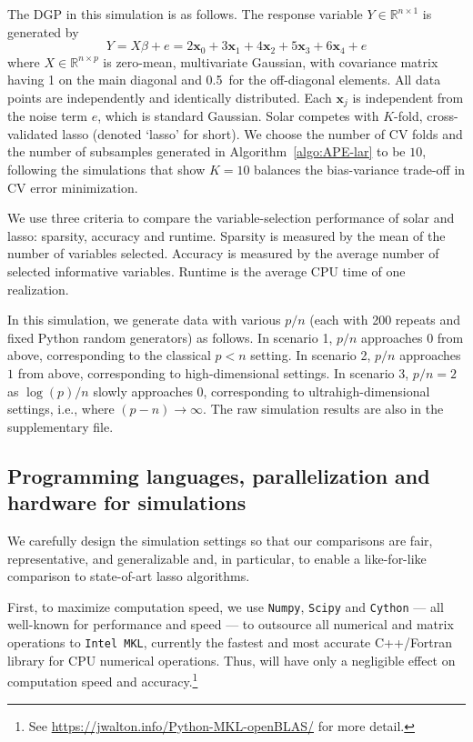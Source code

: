 \documentclass[12pt]{article}
\begin{document}
The DGP in this simulation is as follows. The response variable $Y \in \mathbb{R}^{n \times 1}$ is generated by
%
\begin{equation}
%
  Y =  X\beta + e = 2 \mathbf{x}_0 + 3 \mathbf{x}_1 + 4 \mathbf{x}_2 + 5 \mathbf{x}_3 + 6 \mathbf{x}_4  + e
  \label{eqn:pop_model}
\end{equation}
%
where $X \in \mathbb{R}^{n \times p}$ is zero-mean, multivariate Gaussian, with covariance matrix having 1 on the main diagonal and 0.5~for the off-diagonal elements. All data points are independently and identically distributed. Each $\mathbf{x}_j$ is independent from the noise term $e$, which is standard Gaussian. Solar competes with $K$-fold, cross-validated lasso (denoted `lasso' for short). We choose the number of CV folds and the number of subsamples generated in Algorithm~\ref{algo:APE-lar} to be $10$, following the \citet{friedman2001elements} simulations that show $K = 10$ balances the bias-variance trade-off in CV error minimization.

We use three criteria to compare the variable-selection performance of solar and lasso: sparsity, accuracy and runtime. Sparsity is measured by the mean of the number of variables selected. Accuracy is measured by the average number of selected informative variables. Runtime is the average CPU time of one realization.

In this simulation, we generate data with various $p/n$ (each with 200 repeats and fixed Python random generators) as follows. In scenario 1, $p/n$ approaches $0$ from above, corresponding to the classical $p<n$ setting. In scenario 2, $p/n$ approaches $1$ from above, corresponding to high-dimensional settings. In scenario 3, $p/n=2$ as $\log(p)/n$ slowly approaches $0$, corresponding to ultrahigh-dimensional settings, i.e., where $(p-n)\rightarrow\infty$. The raw simulation results are also in the supplementary file.

\subsection{Programming languages, parallelization and hardware for simulations}

We carefully design the simulation settings so that our comparisons are fair, representative, and generalizable and, in particular, to enable a like-for-like comparison to state-of-art lasso algorithms.

First, to maximize computation speed, we use \texttt{Numpy}, \texttt{Scipy} and \texttt{Cython} --- all well-known for performance and speed --- to outsource all numerical and matrix operations to \texttt{Intel MKL}, currently the fastest and most accurate C++/Fortran library for CPU numerical operations. Thus, will have only a negligible effect on computation speed and accuracy.\footnote{See \url{https://jwalton.info/Python-MKL-openBLAS/} for more detail.}
\end{document}
